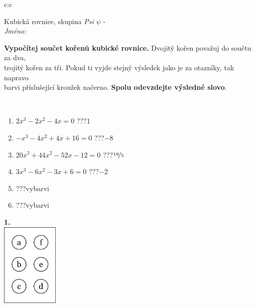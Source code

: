 \documentclass[10pt]{report}
\begin{document}
\begin{tabular}{c:c}
\begin{minipage}[c][104.5mm][t]{0.5\linewidth}
\begin{center}
\vspace{7mm}
{\huge Kubická rovnice, skupina \textit{Psi $\psi$} -}\\[5mm]
\textit{Jméno:}\phantom{xxxxxxxxxxxxxxxxxxxxxxxxxxxxxxxxxxxxxxxxxxxxxxxxxxxxxxxxxxxxxxxxx}\\[5mm]
\begin{minipage}{0.95\linewidth}
\begin{center}
\textbf{Vypočítej součet kořenů kubické rovnice.} Dvojitý kořen považuj do součtu za dva,\\trojitý kořen za tři. Pokud ti vyjde stejný výsledek jako je za otazníky, tak napravo\\barvi příslušející kroužek načerno. \textbf{Spolu odevzdejte výsledné slovo}.
\end{center}
\end{minipage}
\\[1mm]
\begin{minipage}{0.79\linewidth}
\begin{center}
\begin{varwidth}{\linewidth}
\begin{enumerate}
\Large
\item $2x^3-2x^2-4x=0$\quad \dotfill\; ???\;\dotfill \quad $1$
\item $-x^3-4x^2+4x+16=0$\quad \dotfill\; ???\;\dotfill \quad $-8$
\item $20x^3+44x^2-52x-12=0$\quad \dotfill\; ???\;\dotfill \quad $\nicefrac{19}{5}$
\item $3x^3-6x^2-3x+6=0$\quad \dotfill\; ???\;\dotfill \quad $-2$
\item \quad \dotfill\; ???\;\dotfill \quad vybarvi
\item \quad \dotfill\; ???\;\dotfill \quad vybarvi
\end{enumerate}
\end{varwidth}
\end{center}
\end{minipage}
\begin{minipage}{0.20\linewidth}
\begin{center}
{\Huge\bfseries 1.} \\[2mm]
\includegraphics[height=40mm]{../images/braille.png}

\end{center}
\end{minipage}
\end{center}
\end{minipage}
\end{tabular}
\end{document}
